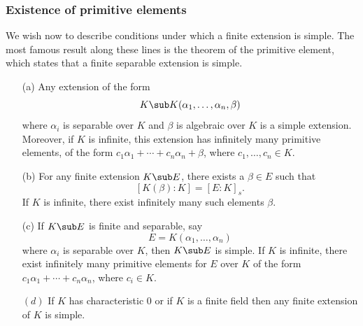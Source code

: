 \subsubsection{Existence of primitive elements}
We wish now to describe conditions under which a finite extension is simple. The most famous result along these lines is the theorem of the primitive element, which states that a finite separable extension is simple.
\begin{theorem}\label{field ext primitive element}
\mbox{}
\begin{itemize}
\item[(a)] Any extension of the form
\[K\sub K(\alpha_1,\dots,\alpha_n,\beta)\]
where $\alpha_i$ is separable over $K$ and $\beta$ is algebraic over $K$ is a simple extension. Moreover, if $K$ is infinite, this extension has infinitely many primitive elements, of the form $c_1\alpha_1+\cdots+c_n\alpha_n+\beta$, where $c_1,\dots,c_n\in K$.
\item[(b)] For any finite extension $K\sub E$, there exists a $\beta\in E$ such that
\[[K(\beta):K]=[E:K]_s.\]
If $K$ is infinite, there exist infinitely many such elements $\beta$.
\item[(c)] If $K\sub E$ is finite and separable, say
\[E=K(\alpha_1,\dots,\alpha_n)\]
where $\alpha_i$ is separable over $K$, then $K\sub E$ is simple. If $K$ is infinite, there exist infinitely many primitive elements for $E$ over $K$ of the form $c_1\alpha_1+\cdots+c_n\alpha_n$, where $c_i\in K$.
\item[$(d)$] If $K$ has characteristic $0$ or if $K$ is a finite field then any finite extension of $K$ is simple.
\end{itemize}
\end{theorem}
